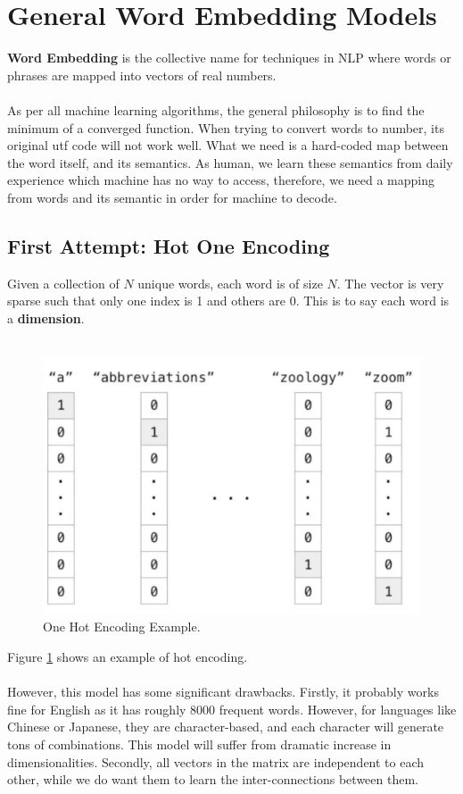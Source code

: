 \documentclass[paper=a4, fontsize=12pt]{scrartcl}
\begin{document}
\section{General Word Embedding Models}
\textbf{Word Embedding} is the collective name for techniques in NLP  where words or phrases are mapped into vectors of real numbers. \\\\
As per all machine learning algorithms, the general philosophy is to find the minimum of a converged function. When trying to convert words to number, its original utf code will not work well. What we need is a hard-coded map between the word itself, and its semantics. As human, we learn these semantics from daily experience which machine has no way to access, therefore, we need a mapping from words and its semantic in order for machine to decode.
\subsection{First Attempt: Hot One Encoding}
Given a collection of $N$ unique words, each word is of size $N$. The vector is very sparse such that only one index is 1 and others are 0. This is to say each word is a \textbf{dimension}. \\\\
\begin{figure}
  \includegraphics[width=\linewidth]{vectors.png}
  \caption{One Hot Encoding Example.}
  \label{fig:vector}
\end{figure}
Figure \ref{fig:vector} shows an example of hot encoding. \\\\
However, this model has some significant drawbacks. Firstly, it probably works fine for English as it has roughly 8000 frequent words. However, for languages like Chinese or Japanese, they are character-based, and each character will generate tons of combinations. This model will suffer from dramatic increase in dimensionalities. Secondly, all vectors in the matrix are independent to each other, while we do want them to learn the inter-connections between them.
\end{document}
